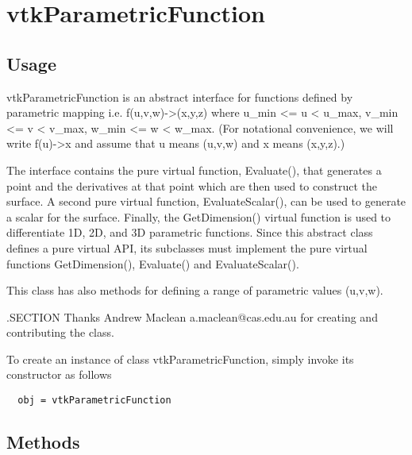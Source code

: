 \section{vtkParametricFunction}

\subsection{Usage}

 vtkParametricFunction is an abstract interface for functions
 defined by parametric mapping i.e. f(u,v,w)->(x,y,z) where 
 u\_min <= u < u\_max, v\_min <= v < v\_max, w\_min <= w < w\_max. (For
 notational convenience, we will write f(u)->x and assume that
 u means (u,v,w) and x means (x,y,z).)

 The interface contains the pure virtual function, Evaluate(), that
 generates a point and the derivatives at that point which are then used to
 construct the surface. A second pure virtual function, EvaluateScalar(),
 can be used to generate a scalar for the surface. Finally, the
 GetDimension() virtual function is used to differentiate 1D, 2D, and 3D
 parametric functions. Since this abstract class defines a pure virtual
 API, its subclasses must implement the pure virtual functions
 GetDimension(), Evaluate() and EvaluateScalar().

 This class has also methods for defining a range of parametric values (u,v,w).
 
 .SECTION Thanks
 Andrew Maclean a.maclean@cas.edu.au for creating and contributing the
 class.


To create an instance of class vtkParametricFunction, simply
invoke its constructor as follows
\begin{verbatim}
  obj = vtkParametricFunction
\end{verbatim}
\subsection{Methods}

